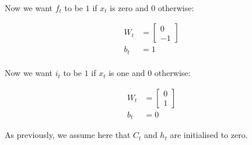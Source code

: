 \paragraph{}
Now we want $f_t$ to be $1$ if $x_t$ is zero and $0$ otherwise:

\begin{align*}
    W_t &=
    \begin{bmatrix}
        0 \\
        -1
    \end{bmatrix}\\
    b_t &= 1
\end{align*}

\paragraph{}
Now we want $i_t$ to be $1$ if $x_t$ is one and $0$ otherwise:

\begin{align*}
    W_t &=
    \begin{bmatrix}
        0 \\
        1
    \end{bmatrix}\\
    b_t &= 0
\end{align*}

As previously, we assume here that $C_t$ and $h_t$ are initialised to zero.
